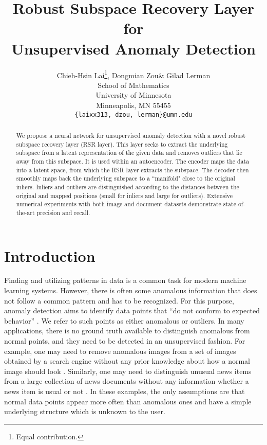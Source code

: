 \documentclass{article} \usepackage{iclr2020_conference,times}
\title{Robust Subspace Recovery Layer for \\Unsupervised Anomaly Detection}
\author{Chieh-Hsin Lai\thanks{ Equal contribution.}, Dongmian Zou\printfnsymbol{1}\& Gilad Lerman  \\
School of Mathematics\\
University of Minnesota\\
Minneapolis, MN 55455 \\
\texttt{\{laixx313, dzou, lerman\}@umn.edu} 
}
\begin{document}
\maketitle

\begin{abstract}
We propose a neural network for unsupervised anomaly detection with a novel robust subspace recovery layer (RSR layer). This layer seeks to extract the underlying subspace from a latent representation of the given data and removes outliers that lie away from this subspace. It is used within an autoencoder. The encoder maps the data into a latent space, from which the RSR layer extracts the subspace. The decoder then smoothly maps back the underlying subspace to a ``manifold" close to the original inliers. Inliers and outliers are distinguished according to the distances between the original and mapped positions (small for inliers and large for outliers). Extensive numerical experiments with both image and document datasets demonstrate state-of-the-art precision and recall. 
\end{abstract}

\section{Introduction}\label{sec:intro}

Finding and utilizing patterns in data is a common task for modern machine learning  systems. 
However, there is often some anomalous information that does not follow a common pattern and has to be recognized. For this purpose, anomaly detection aims to identify data points that ``do not conform to expected behavior'' \citep{chandola2009anomaly}. We refer to such points as either anomalous or outliers. In many applications, there is no ground truth available to distinguish anomalous from normal points, and they need to be detected in an unsupervised fashion. For example, one may need to remove anomalous images from a set of images obtained by a search engine without any prior knowledge about how a normal image should look \citep{xia2015learning}. Similarly, one may need to distinguish unusual news items from a large collection of news documents without any information whether a news item is usual or not \citep{kannan2017outlier}. In these examples, the only assumptions are that normal data points appear more often than anomalous ones and have a simple underlying structure which is unknown to the user.
\end{document}
